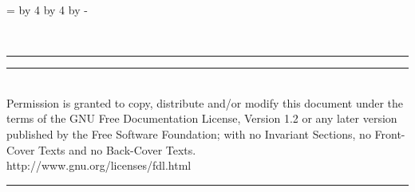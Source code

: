 \documentclass[8pt,pagesize,twoside,footexclude,headexclude]{scrartcl}
\begin{document}
\clearpage
\pagestyle{empty}
\newcount\currentpage 
\currentpage=\value{page} 
\divide\currentpage by 4  
\multiply\currentpage by 4  
\advance\currentpage by -\value{page}
%
\begin{titlepage}
  \begin{center}
    \renewcommand{\rmdefault}{ptm} %
    \vspace*{15mm}
    \vfill
    \begin{minipage}{\titlepagewidth}
      \begin{center}
        \rmfamily\mdseries\itshape\fontsize{300}{0}\selectfont
        \\
      \end{center}
    \end{minipage}
    \vfill
    \rule{1.75cm}{0pt}
    \vfill
    \begin{minipage}{\titlepagewidth}
      \hrule
      \vspace{1.5mm}
      \rmfamily\small
      \\

      Permission is granted to copy, distribute and/or modify this
      document under the terms of the GNU Free Documentation License,
      Version 1.2 or any later version published by the Free Software
      Foundation; with no Invariant Sections, no Front-Cover Texts and
      no Back-Cover Texts.\\
      http://www.gnu.org/licenses/fdl.html\\

      \vspace{-1mm}
      \hrule
    \end{minipage}
  \end{center}
\end{titlepage}
\end{document}
